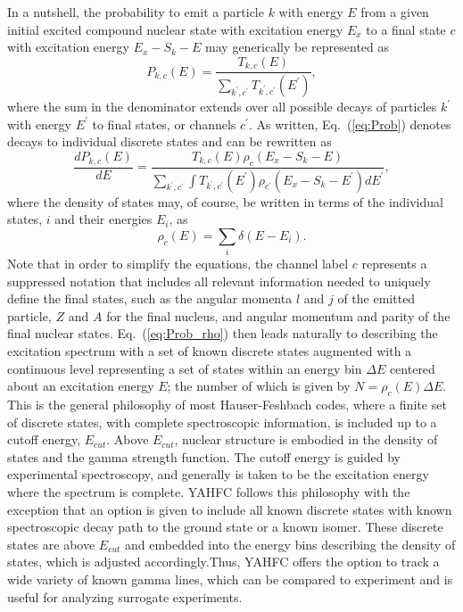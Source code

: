 \documentclass[
10pt,
showpacs,preprintnumbers,footinbib,
amsfonts,amsmath,amssymb,
aps,
prc,twocolumn,groupedaddress,superscriptaddress,
showkeys,
nofootinbib
]{revtex4-1}
\begin{document}
In a nutshell, the probability to emit a particle $k$ with energy $E$ from a given initial excited compound nuclear state with excitation energy $E_x$ to a final state $c$ with excitation energy $E_x - S_k - E$ may generically be represented as
\begin{equation}
P_{k,c}(E) = \frac{T_{k,c}(E)}{\sum_{k^\prime,c^\prime}T_{k^\prime,c^\prime}(E^\prime)},
\label{eq:Prob}
\end{equation} 
where the sum in the denominator extends over all possible decays of particles $k^\prime$ with energy $E^\prime$ to final states, or channels $c^\prime$. As written, Eq.~(\ref{eq:Prob}) denotes decays to individual discrete states and can be rewritten as
\begin{equation}
\frac{dP_{k,c}(E)}{dE} = \frac{T_{k,c}(E)\rho_c(E_x-S_k - E)}{\sum_{k^\prime,c^\prime}\int T_{k^\prime,c^\prime}(E^\prime)\rho_{c^\prime}(E_x-S_k - E^\prime)dE^\prime},
\label{eq:Prob_rho}
\end{equation}
where the density of states may, of course, be written in terms of the individual states, $i$ and their energies $E_i$, as
\begin{equation}
\rho_c(E) = \sum_i \delta (E - E_i).
\end{equation}
Note that in order to simplify the equations, the channel label $c$ represents a suppressed notation that includes all relevant information needed to uniquely define the final states, such as the angular momenta $l$ and $j$ of the emitted particle, $Z$ and $A$ for the final nucleus, and angular momentum and parity of the final nuclear states. Eq.~(\ref{eq:Prob_rho}) then leads naturally to describing the excitation spectrum with a set of known discrete states augmented with a continuous level representing a set of states within an energy bin $\Delta E$ centered about an excitation energy $E$; the number of which is given by $N=\rho_c(E)\Delta E$. This is the general philosophy of most Hauser-Feshbach codes, where a finite set of discrete states, with complete spectroscopic information, is included up to a cutoff energy, $E_{cut}$. Above $E_{cut}$, nuclear structure is embodied in the density of states and the gamma strength function. The cutoff energy is guided by experimental spectroscopy, and generally is taken to be the excitation energy where the spectrum is complete. YAHFC follows this philosophy with the exception that an option is given to include all known discrete states with known spectroscopic decay path to the ground state or a known isomer. These discrete states are above $E_{cut}$ and embedded into the energy bins describing the density of states, which is adjusted accordingly.Thus, YAHFC offers the option to track a wide variety of known gamma lines, which can be compared to experiment and is useful for analyzing surrogate experiments. 
\end{document}
